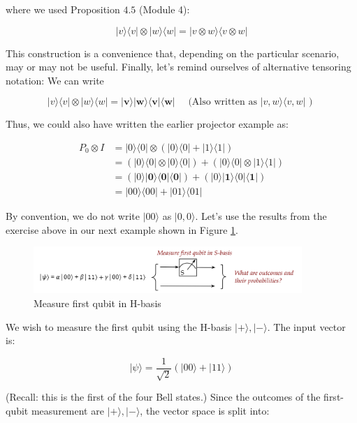 \documentclass[main.tex]{subfiles}
\begin{document}
    where we used Proposition $4.5$ (Module 4):
    
    $$
    |v\rangle\langle v|\otimes| w\rangle\langle w|=| v \otimes w\rangle\langle v \otimes w|
    $$
    
    This construction is a convenience that, depending on the particular scenario, may or may not be useful. Finally, let's remind ourselves of alternative tensoring notation: We can write
    
    $$
    |v\rangle\langle v|\otimes| w\rangle\langle w|=| \mathbf{v}\rangle|\mathbf{w}\rangle\langle\mathbf{v}|\langle\mathbf{w}| \quad \text { (Also written as }|v, w\rangle\langle v, w| \text { ) }
    $$
    
    Thus, we could also have written the earlier projector example as:
    
    $$
    \begin{aligned}
    P_{0} \otimes I &=|0\rangle\langle 0| \otimes(|0\rangle\langle 0|+| 1\rangle\langle 1|) \\
    &=(|0\rangle\langle 0|\otimes| 0\rangle\langle 0|)+(|0\rangle\langle 0|\otimes| 1\rangle\langle 1|) \\
    &=(|0\rangle|\mathbf{0}\rangle\langle\mathbf{0}|\langle\mathbf{0}|)+(|0\rangle|\mathbf{1}\rangle\langle 0|\langle\mathbf{1}|)\\
    &=|00\rangle\langle 00|+| 01\rangle\langle 01|
    \end{aligned}
    $$
    
    By convention, we do not write $|00\rangle$ as $|0,0\rangle$. Let's use the results from the exercise above in our next example shown in Figure \ref{fig:07measure6}.
    
    \begin{figure}
        \centering
        \includegraphics[width=4in]{notes/figs/n07/07measure6.png}
        \caption{Measure first qubit in H-basis}
        \label{fig:07measure6}
    \end{figure}
    
    We wish to measure the first qubit using the $\mathrm{H}$-basis $|+\rangle,|-\rangle$. The input vector is:
    
    $$
    |\psi\rangle=\frac{1}{\sqrt{2}}(|00\rangle+|11\rangle)
    $$
    
    (Recall: this is the first of the four Bell states.) Since the outcomes of the first-qubit measurement are $|+\rangle,|-\rangle$, the vector space is split into:
    
\end{document}
